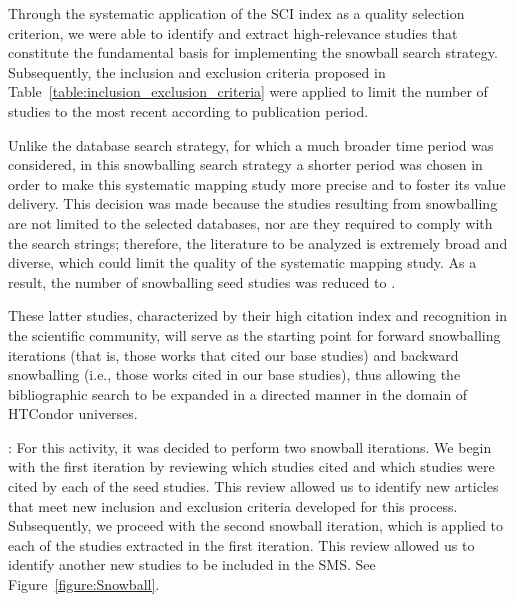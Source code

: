 Through the systematic application of the SCI index as a quality selection criterion, we were able to identify and extract \csiSelected{} high-relevance studies that constitute the fundamental basis for implementing the snowball search strategy. Subsequently, the inclusion and exclusion criteria proposed in Table~\ref{table:inclusion_exclusion_criteria} were applied to limit the number of studies to the most recent according to publication period.

Unlike the database search strategy, for which a much broader time period was considered, in this snowballing search strategy a shorter period was chosen in order to make this systematic mapping study more precise and to foster its value delivery. This decision was made because the studies resulting from snowballing are not limited to the selected databases, nor are they required to comply with the search strings; therefore, the literature to be analyzed is extremely broad and diverse, which could limit the quality of the systematic mapping study. As a result, the number of snowballing seed studies was reduced to \newSnowballStudies{}.

These latter studies, characterized by their high citation index and recognition in the scientific community, will serve as the starting point for forward snowballing iterations (that is, those works that cited our base studies) and backward snowballing (i.e., those works cited in our base studies), thus allowing the bibliographic search to be expanded in a directed manner in the domain of HTCondor universes.

: For this activity, it was decided to perform two snowball iterations. We begin with the first iteration by reviewing which studies cited and which studies were cited by each of the \newSnowballStudies{} seed studies. This review allowed us to identify \firstSnowballIterationStudies{} new articles that meet new inclusion and exclusion criteria developed for this process. Subsequently, we proceed with the second snowball iteration, which is applied to each of the \firstSnowballIterationStudies{} studies extracted in the first iteration. This review allowed us to identify another \secondSnowballIterationStudies{} new studies to be included in the SMS. See Figure~\ref{figure:Snowball}.\\



